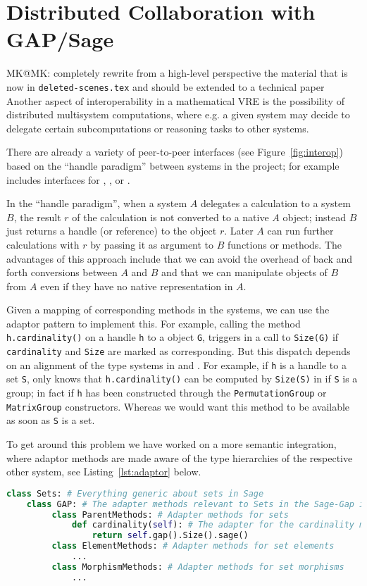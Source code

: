\section{Distributed Collaboration with GAP/Sage}\label{sec:gapsage}
\begin{newpart}{MK@MK: completely rewrite from a high-level perspective the material that
    is now in \texttt{deleted-scenes.tex} and should be extended to a technical paper}
Another aspect of interoperability in a mathematical VRE is the possibility of distributed
multisystem computations, where e.g. a given system may decide to delegate
certain subcomputations or reasoning tasks to other systems.

There are already a variety of peer-to-peer interfaces (see Figure~\ref{fig:interop})
based on the ``handle paradigm'' between systems in the \ODK project;
for example \Sage includes interfaces for \GAP, \Singular, or \Pari.

In the ``handle paradigm'', when a system $A$ delegates a calculation to a system $B$, the
result $r$ of the calculation is not converted to a native $A$ object; instead $B$ just
returns a handle (or reference) to the object $r$. Later $A$ can run further calculations
with $r$ by passing it as argument to $B$ functions or methods. The advantages of this
approach include that we can avoid the overhead of back and forth conversions between $A$
and $B$ and that we can manipulate objects of $B$ from $A$ even if they have no native
representation in $A$.

Given a mapping of corresponding methods in the systems, we can use the adaptor pattern to
implement this. For example, calling the method \texttt{h.cardinality()} on a \Sage handle
\texttt{h} to a \GAP object \texttt{G}, triggers in \GAP a call to \texttt{Size(G)} if
\texttt{cardinality} and \texttt{Size} are marked as corresponding. But this dispatch
depends on an alignment of the type systems in \Sage and \GAP. For example, if \texttt{h}
is a handle to a set \texttt{S}, \Sage only knows that \texttt{h.cardinality()} can be
computed by \texttt{Size(S)} in \GAP if \texttt{S} is a group; in fact if \texttt{h} has
been constructed through the \texttt{PermutationGroup} or \texttt{MatrixGroup}
constructors. Whereas we would want this method to be available as soon as \texttt{S} is a
set.

To get around this problem we have worked on a more semantic
integration, where adaptor methods are made aware of the type
hierarchies of the respective other system, see
Listing~\ref{lst:adaptor} below.
\begin{lstlisting}[language=Python,label=lst:adaptor,
  caption=A Semantic Adaptor Method in \Sage]
class Sets: # Everything generic about sets in Sage
    class GAP: # The adapter methods relevant to Sets in the Sage-Gap interface
         class ParentMethods: # Adapter methods for sets
             def cardinality(self): # The adapter for the cardinality method
                 return self.gap().Size().sage()
         class ElementMethods: # Adapter methods for set elements
             ...
         class MorphismMethods: # Adapter methods for set morphisms
             ...
\end{lstlisting}


\end{newpart}
